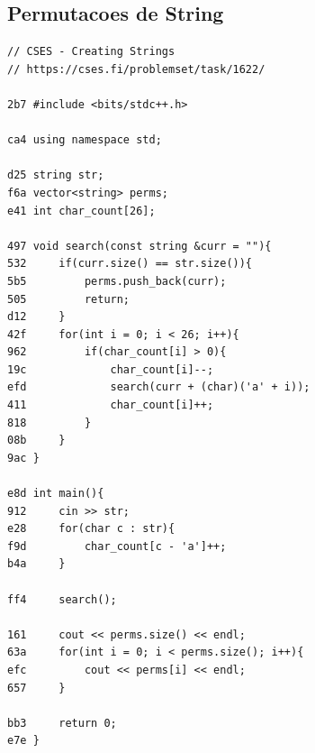 \documentclass[11pt, a4paper, twoside]{article}
\begin{document}
\subsection{Permutacoes de String}
\begin{lstlisting}
// CSES - Creating Strings
// https://cses.fi/problemset/task/1622/

2b7 #include <bits/stdc++.h>
 
ca4 using namespace std;
 
d25 string str;
f6a vector<string> perms;
e41 int char_count[26];
 
497 void search(const string &curr = ""){
532     if(curr.size() == str.size()){
5b5         perms.push_back(curr);
505         return;
d12     }
42f     for(int i = 0; i < 26; i++){
962         if(char_count[i] > 0){
19c             char_count[i]--;
efd             search(curr + (char)('a' + i));
411             char_count[i]++;
818         }
08b     }
9ac }
 
e8d int main(){ 
912     cin >> str;
e28     for(char c : str){
f9d         char_count[c - 'a']++;
b4a     }
     
ff4     search();
        
161     cout << perms.size() << endl;
63a     for(int i = 0; i < perms.size(); i++){
efc         cout << perms[i] << endl;
657     }
     
bb3     return 0;
e7e }
\end{lstlisting}
\end{document}
